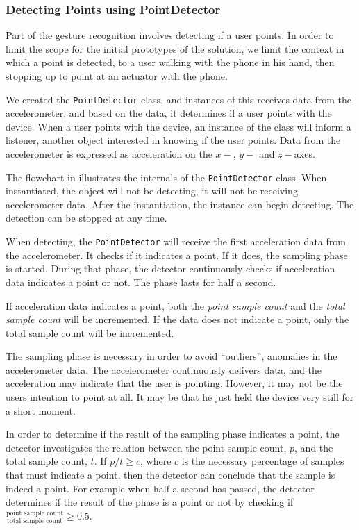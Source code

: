 \subsubsection{Detecting Points using PointDetector}

Part of the gesture recognition involves detecting if a user points. 
In order to limit the scope for the initial prototypes of the solution, 
we limit the context in which a point is detected, 
to a user walking with the phone in his hand, 
then stopping up to point at an actuator with the phone.

We created the \texttt{PointDetector} class, 
and instances of this receives data from the accelerometer, 
and based on the data, 
it determines if a user points with the device. 
When a user points with the device, 
an instance of the class will inform a listener, 
\ie another object interested in knowing if the user points.
Data from the accelerometer is expressed as acceleration on the $x-$, $y-$ and $z-$axes.

The flowchart in  illustrates the internals of the \texttt{PointDetector} class. 
When instantiated, the object will not be detecting, 
\ie it will not be receiving accelerometer data. 
After the instantiation, the instance can begin detecting. 
The detection can be stopped at any time.

When detecting, the \texttt{PointDetector} will receive the first acceleration data from the accelerometer. 
It checks if it indicates a point. 
If it does, the sampling phase is started.
During that phase, the detector continuously checks if acceleration data indicates a point or not. 
The phase lasts for half a second.

If acceleration data indicates a point, 
both the \emph{point sample count} and the \emph{total sample count} will be incremented. 
If the data does not indicate a point, 
only the total sample count will be incremented.

The sampling phase is necessary in order to avoid ``outliers'', 
\ie anomalies in the accelerometer data. 
The accelerometer continuously delivers data, 
and the acceleration may indicate that the user is pointing. 
However, it may not be the users intention to point at all. 
It may be that he just held the device very still for a short moment.

In order to determine if the result of the sampling phase indicates a point, 
the detector investigates the relation between the point sample count, $p$, 
and the total sample count, $t$. 
If $p/t \geq c$, where $c$ is the necessary percentage of samples that must indicate a point, 
then the detector can conclude that the sample is indeed a point.
For example when half a second has passed, the detector determines if the result of the phase is a point or not
by checking if $\frac{\text{point sample count}}{\text{total sample count}} \geq 0.5$.

